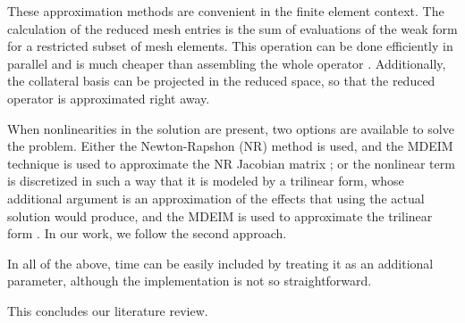 These approximation methods are convenient in the finite element context.
The calculation of the reduced mesh entries is the sum of evaluations of the 
weak form for a restricted subset of mesh elements.
This operation can be done efficiently in parallel and 
is much cheaper than assembling the whole operator 
\cite{Santo_Manzoni_2019}.
Additionally, the collateral basis can be projected in the reduced space,
so that the reduced operator is approximated right away. 

When nonlinearities in the solution are present, 
two options are available to solve the problem.
Either the \mbox{Newton-Rapshon} (NR) method 
is used, 
and the MDEIM technique is used 
to approximate the NR Jacobian matrix \cite{Wirtz2014};
or the nonlinear term is discretized in such a way
that it is modeled by a trilinear form,
whose additional argument is an approximation of 
the effects that using the actual solution would produce,
and the MDEIM is used to approximate the trilinear form
\cite{Santo_Manzoni_2019}.
In our work, we follow the second approach.

In all of the above, 
time can be easily included by treating it as an additional parameter,
although the implementation is not so straightforward. 

This concludes our literature review.





